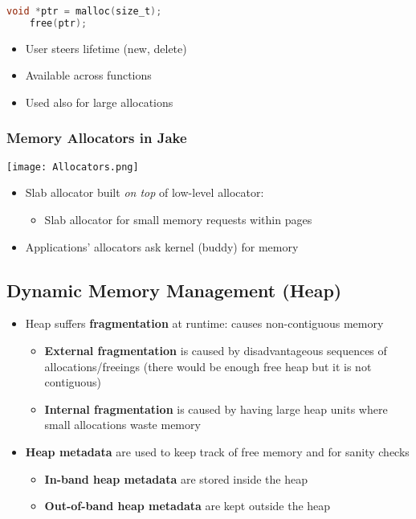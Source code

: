 \begin{lstlisting}[language={C}]
    void *ptr = malloc(size_t);
    free(ptr);                  
\end{lstlisting}
\begin{itemize}
    \item User steers lifetime (new, delete)
    \item Available across functions
    \item Used also for large allocations
\end{itemize}

\subsubsection{Memory Allocators in Jake}
\begin{center}
    \texttt{[image: Allocators.png]}
\end{center}
\begin{itemize}
    \item Slab allocator built \textit{on top} of low-level allocator:
          \begin{itemize}
              \item Slab allocator for small memory requests within pages
          \end{itemize}
    \item Applications' allocators ask kernel (buddy) for memory 
\end{itemize}

\subsection{Dynamic Memory Management (Heap)}
\begin{itemize}
    \item Heap suffers \textbf{fragmentation} at runtime: causes non-contiguous memory
          \noindent\begin{itemize}
              \item \textbf{External fragmentation} is caused by disadvantageous sequences of allocations/freeings (there would be enough free heap but it is not contiguous)
              \item \textbf{Internal fragmentation} is caused by having large heap units where small allocations waste memory
          \end{itemize}
    \item \textbf{Heap metadata} are used to keep track of free memory and for sanity checks
          \noindent\begin{itemize}
              \item \textbf{In-band heap metadata} are stored inside the heap
              \item \textbf{Out-of-band heap metadata} are kept outside the heap
          \end{itemize}
\end{itemize}

